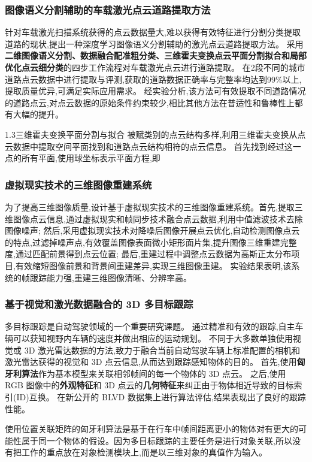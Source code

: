 \documentclass{amsart}
\begin{document}
\subsubsection{图像语义分割辅助的车载激光点云道路提取方法}
\cite{于博}针对车载激光扫描系统获得的点云数据量大,难以获得有效特征进行分割分类提取道路的现状,提出一种深度学习图像语义分割辅助的激光点云道路提取方法。
采用\textbf{二维图像语义分割、数据融合配准粗分类、三维霍夫变换点云平面分割拟合和局部优化点云细分类}的四步工作流程对车载激光点云进行道路提取。
在2段不同的城市道路点云数据中进行提取与评测,获取的道路数据正确率与完整率均达到99\%以上,提取质量优异,可满足实际应用需求。
经实验分析,该方法可有效提取不同道路情况的道路点云,对点云数据的原始条件约束较少,相比其他方法在普适性和鲁棒性上都有大幅的提升。

1.3三维霍夫变换平面分割与拟合
被赋类别的点云结构多样,利用三维霍夫变换从点云数据中提取空间平面找到和道路点云结构相符的点云信息。
首先找到经过这一点的所有平面,使用球坐标表示平面方程,即


\subsubsection{虚拟现实技术的三维图像重建系统}
为了提高三维图像质量,设计基于虚拟现实技术的三维图像重建系统。首先,提取三维图像点云信息,通过虚拟现实和帧同步技术融合点云数据,利用中值滤波技术去除图像噪声;
然后,采用虚拟现实技术对降噪后图像开展点云优化,自动检测图像点云的特点,过滤掉噪声点,有效覆盖图像表面微小矩形面片集,提升图像三维重建完整度,通过匹配前景得到点云位置;
最后,重建过程中调整点云数据为高斯正太分布项目,有效缩短图像前景和背景间重建差异,实现三维图像重建。
实验结果表明,该系统的帧跟踪能力强,重建三维图像清晰、分辨率高。

\subsubsection{基于视觉和激光数据融合的 3D 多目标跟踪}
多目标跟踪是自动驾驶领域的一个重要研究课题。
通过精准和有效的跟踪,自主车辆可以获知视野内车辆的速度并做出相应的运动规划。
不同于大多数单独使用视觉或 3D 激光雷达数据的方法,致力于融合当前自动驾驶车辆上标准配置的相机和激光雷达获得的视觉和 3D 点云信息,从而达到跟踪感知物体的目的。
首先,使用\textbf{匈牙利算法}作为基本模型来关联相邻帧间的每一个物体的 3D 点云。
之后,使用 RGB 图像中的\textbf{外观特征}和 3D 点云的\textbf{几何特征}来纠正由于物体相近导致的目标索引(ID)互换。
在新公开的 BLVD 数据集上进行算法评估,结果表现出了良好的跟踪性能。


使用位置关联矩阵的匈牙利算法是基于在行车中帧间距离更小的物体对有更大的可能性属于同一个物体的假设。因为多目标跟踪的主要任务是进行对象关联,所以没有把工作的重点放在对象检测模块上,而是以三维对象的真值作为输入。
\end{document}

